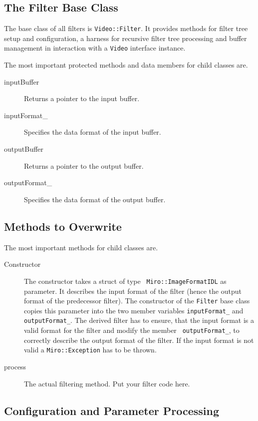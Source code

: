 \subsection{The Filter Base Class}

The base class of all filters is {\tt Video::Filter}. It provides
methods for filter tree setup and configuration, a harness for
recursive filter tree processing and buffer management in interaction
with a {\tt Video} interface instance.

The most important protected methods and data members for child classes are.
\begin{description}
\item[inputBuffer] Returns a pointer to the input buffer.
\item[inputFormat_] Specifies the data format of the input buffer.
\item[outputBuffer] Returns a pointer to the output buffer.
\item[outputFormat_] Specifies the data format of the output buffer.
\end{description}

\subsection{Methods to Overwrite}

The most important methods for child classes are.
\begin{description}
\item[Constructor] The constructor takes a struct of type {\tt
    Miro::ImageFormatIDL} as parameter. It describes the input format
  of the filter (hence the output format of the predecessor filter).
  The constructor of the {\tt Filter} base class copies this parameter
  into the two member variables {\tt inputFormat\_} and {\tt
    outputFormat_}. The derived filter has to ensure, that the input
  format is a valid format for the filter and modify the member {\tt
    outputFormat\_}, to correctly describe the output format of the
  filter. If the input format is not valid a {\tt Miro::Exception} has
  to be thrown.
\item[process] The actual filtering method. Put your filter code here.
\end{description}

\subsection{Configuration and Parameter Processing}

